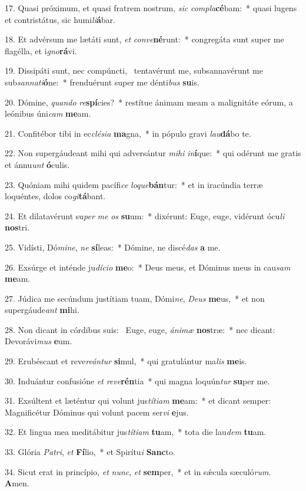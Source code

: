 17. Quasi próximum, et quasi fratrem nostrum, \textit{sic} \textit{com}\textit{pla}\textbf{cé}bam:~*  quasi lugens et contristátus, sic humi\textit{li}\textbf{á}bar.\

18. Et advérsum me lætáti sunt, \textit{et} \textit{con}\textit{ve}\textbf{né}runt:~*  congregáta sunt super me flagélla, et i\textit{gno}\textbf{rá}vi.\

19. Dissipáti sunt, nec compúncti, \dag\  tentavérunt me, subsannavérunt me sub\textit{san}\textit{na}\textit{ti}\textbf{ó}ne:~*  frenduérunt super me dénti\textit{bus} \textbf{su}is.\

20. Dómine, \textit{quan}\textit{do} \textit{re}\textbf{spí}cies?~*  restítue ánimam meam a malignitáte eórum, a leónibus úni\textit{cam} \textbf{me}am.\

21. Confitébor tibi in ec\textit{clé}\textit{si}\textit{a} \textbf{ma}gna,~*  in pópulo gravi \textit{lau}\textbf{dá}bo te.\

22. Non supergáudeant mihi qui adversántur \textit{mi}\textit{hi} \textit{in}\textbf{í}que:~*  qui odérunt me gratis et ánnu\textit{unt} \textbf{ó}culis.\

23. Quóniam mihi quidem pacífi\textit{ce} \textit{lo}\textit{que}\textbf{bán}tur:~*  et in iracúndia terræ loquéntes, dolos co\textit{gi}\textbf{tá}bant.\

24. Et dilatavérunt su\textit{per} \textit{me} \textit{os} \textbf{su}um:~*  dixérunt: Euge, euge, vidérunt ócu\textit{li} \textbf{nos}tri.\

25. Vidísti, Dó\textit{mi}\textit{ne}, \textit{ne} \textbf{sí}leas:~*  Dómine, ne discé\textit{das} \textbf{a} me.\

26. Exsúrge et inténde ju\textit{dí}\textit{ci}\textit{o} \textbf{me}o:~*  Deus meus, et Dóminus meus in cau\textit{sam} \textbf{me}am.\

27. Júdica me secúndum justítiam tuam, Dómi\textit{ne}, \textit{De}\textit{us} \textbf{me}us,~*  et non supergáude\textit{ant} \textbf{mi}hi.\

28. Non dicant in córdibus suis: \dag\  Euge, euge, \textit{á}\textit{ni}\textit{mæ} \textbf{nos}træ:~*  nec dicant: Devorávi\textit{mus} \textbf{e}um.\

29. Erubéscant et reve\textit{re}\textit{án}\textit{tur} \textbf{si}mul,~*  qui gratulántur ma\textit{lis} \textbf{me}is.\

30. Induántur confusióne \textit{et} \textit{re}\textit{ve}\textbf{rén}tia~*  qui magna loquún\textit{tur} \textbf{su}per me.\

31. Exsúltent et læténtur qui volunt jus\textit{tí}\textit{ti}\textit{am} \textbf{me}am:~*  et dicant semper: Magnificétur Dóminus qui volunt pacem ser\textit{vi} \textbf{e}jus.\

32. Et lingua mea meditábitur jus\textit{tí}\textit{ti}\textit{am} \textbf{tu}am,~*  tota die lau\textit{dem} \textbf{tu}am.\

33. Glória \textit{Pa}\textit{tri}, \textit{et} \textbf{Fí}lio,~*  et Spirítu\textit{i} \textbf{Sanc}to.\

34. Sicut erat in princípio, \textit{et} \textit{nunc}, \textit{et} \textbf{sem}per,~*  et in sǽcula sæculó\textit{rum}. \textbf{A}men.\

